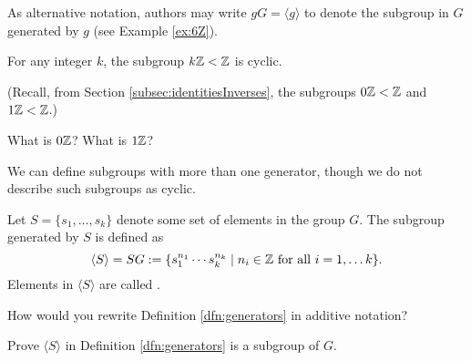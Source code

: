 \documentclass[../algebraNotesMSRI-UP2016.tex]{subfiles}
\begin{document}
\begin{frame}[c]
As alternative notation, authors may write $gG=\langle g\rangle$ to denote the subgroup in $G$ generated by $g$ (see Example \ref{ex:6Z}).


\smallGap
\begin{ex}\label{ex:kZcyclic}
For any integer $k$, the subgroup $k\mathbb Z<\mathbb Z$ is cyclic.  

\smallGap
(Recall, from Section \ref{subsec:identitiesInverses}, the subgroups $0\mathbb Z<\mathbb Z$ and $1\mathbb Z<\mathbb Z$.)
\end{ex}

\smallGap
\begin{que}
What is $0\mathbb Z$?  What is $1\mathbb Z$?
\end{que}
\end{frame}

\begin{frame}
We can define subgroups with more than one generator, though we do not describe such subgroups as cyclic.   

\smallGap 
\begin{dfn}\label{dfn:generators}
Let $S=\{s_1,\dots,s_k\}$ denote some set of elements in the group $G$.  The subgroup generated by $S$ is defined as
\[
\langle S\rangle=SG
:=\{s_1^{n_1}\cdots s_k^{n_k}\mid n_i\in \mathbb Z \text{ for all }i=1,\dots k\}.
\]
Elements in $\langle S\rangle$ are called .  
\end{dfn}

\smallGap
\begin{que}
How would you rewrite Definition \ref{dfn:generators} in additive notation?  
\end{que}

\smallGap
\begin{exe}[cf. Problem 51]\label{exe:prob51}
Prove $\langle S\rangle$ in Definition \ref{dfn:generators} is a subgroup of $G$. 
\end{exe}
\end{frame}
\end{document}
